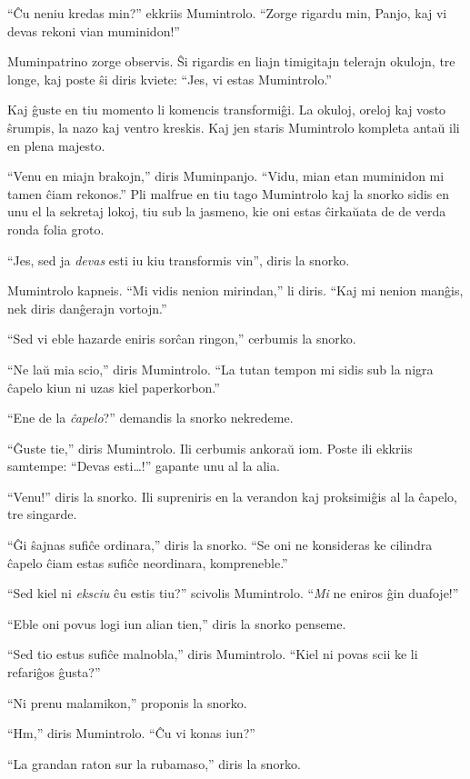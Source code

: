 ``Ĉu neniu kredas min?'' ekkriis Mumintrolo. ``Zorge rigardu min, Panjo, kaj vi devas rekoni vian muminidon!''

Muminpatrino zorge observis. Ŝi rigardis en liajn timigitajn telerajn okulojn, tre longe, kaj poste ŝi diris kviete: ``Jes, vi estas Mumintrolo.''

Kaj ĝuste en tiu momento li komencis transformiĝi. La okuloj, oreloj kaj vosto ŝrumpis, la nazo kaj ventro kreskis. Kaj jen staris Mumintrolo kompleta antaŭ ili en plena majesto.

``Venu en miajn brakojn,'' diris Muminpanjo. ``Vidu, mian etan muminidon mi tamen ĉiam rekonos.''
\sectionbreak
Pli malfrue en tiu tago Mumintrolo kaj la snorko sidis en unu el la sekretaj lokoj, tiu sub la jasmeno, kie oni estas ĉirkaŭata de de verda ronda folia groto.

``Jes, sed ja \emph{devas} esti iu kiu transformis vin'', diris la snorko.

Mumintrolo kapneis. ``Mi vidis nenion mirindan,'' li diris. ``Kaj mi nenion manĝis, nek diris danĝerajn vortojn.''

``Sed vi eble hazarde eniris sorĉan ringon,'' cerbumis la snorko.

``Ne laŭ mia scio,'' diris Mumintrolo. ``La tutan tempon mi sidis sub la nigra ĉapelo kiun ni uzas kiel paperkorbon.''

``Ene de la \emph{ĉapelo}?'' demandis la snorko nekredeme.

``Ĝuste tie,'' diris Mumintrolo. Ili cerbumis ankoraŭ iom. Poste ili ekkriis samtempe: ``Devas esti{\ldots}!'' gapante unu al la alia.

``Venu!'' diris la snorko.
\sectionbreak
Ili supreniris en la verandon kaj proksimiĝis al la ĉapelo, tre singarde.

``Ĝi ŝajnas sufiĉe ordinara,'' diris la snorko. ``Se oni ne konsideras ke cilindra ĉapelo ĉiam estas sufiĉe neordinara, kompreneble.''

``Sed kiel ni \emph{eksciu} ĉu estis tiu?'' scivolis Mumintrolo. ``\emph{Mi} ne eniros ĝin duafoje!''

``Eble oni povus logi iun alian tien,'' diris la snorko penseme.

``Sed tio estus sufiĉe malnobla,'' diris Mumintrolo. ``Kiel ni povas scii ke li refariĝos ĝusta?''

``Ni prenu malamikon,'' proponis la snorko.

``Hm,'' diris Mumintrolo. ``Ĉu vi konas iun?''

``La grandan raton sur la rubamaso,'' diris la snorko.

